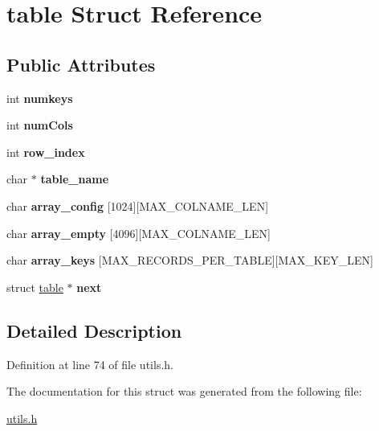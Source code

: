 \hypertarget{structtable}{
\section{table Struct Reference}
\label{structtable}
}
\subsection*{Public Attributes}
\begin{DoxyCompactItemize}
\item 
\hypertarget{structtable_a7d6da49d49646707d55e183332a0e66b}{
int {\bfseries numkeys}}
\label{structtable_a7d6da49d49646707d55e183332a0e66b}

\item 
\hypertarget{structtable_add1d6c074ad048b1237973e36c8ccb39}{
int {\bfseries numCols}}
\label{structtable_add1d6c074ad048b1237973e36c8ccb39}

\item 
\hypertarget{structtable_ad964030d24189f4a1e8ab8bcb406b885}{
int {\bfseries row\_\-index}}
\label{structtable_ad964030d24189f4a1e8ab8bcb406b885}

\item 
\hypertarget{structtable_a9c50d6472752cce7002f6ad02ef6e160}{
char $\ast$ {\bfseries table\_\-name}}
\label{structtable_a9c50d6472752cce7002f6ad02ef6e160}

\item 
\hypertarget{structtable_ae58d062f7070df4656200ef2caab9075}{
char {\bfseries array\_\-config} \mbox{[}1024\mbox{]}\mbox{[}MAX\_\-COLNAME\_\-LEN\mbox{]}}
\label{structtable_ae58d062f7070df4656200ef2caab9075}

\item 
\hypertarget{structtable_a6f25abe10b04d4fcbc3a29f6b67d09e4}{
char {\bfseries array\_\-empty} \mbox{[}4096\mbox{]}\mbox{[}MAX\_\-COLNAME\_\-LEN\mbox{]}}
\label{structtable_a6f25abe10b04d4fcbc3a29f6b67d09e4}

\item 
\hypertarget{structtable_a10c4bfb717ad6b0b6748d6d2414f84cb}{
char {\bfseries array\_\-keys} \mbox{[}MAX\_\-RECORDS\_\-PER\_\-TABLE\mbox{]}\mbox{[}MAX\_\-KEY\_\-LEN\mbox{]}}
\label{structtable_a10c4bfb717ad6b0b6748d6d2414f84cb}

\item 
\hypertarget{structtable_af57a310935d2e6d39207a999c93d48bf}{
struct \hyperlink{structtable}{table} $\ast$ {\bfseries next}}
\label{structtable_af57a310935d2e6d39207a999c93d48bf}

\end{DoxyCompactItemize}


\subsection{Detailed Description}


Definition at line 74 of file utils.h.



The documentation for this struct was generated from the following file:\begin{DoxyCompactItemize}
\item 
\hyperlink{utils_8h}{utils.h}\end{DoxyCompactItemize}
